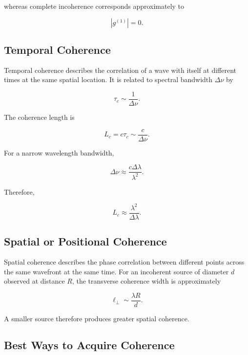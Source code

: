 \documentclass[12pt]{article}
\begin{document}
whereas complete incoherence corresponds approximately to

\begin{equation}
|g^{(1)}|=0.
\end{equation}

\subsection{Temporal Coherence}

Temporal coherence describes the correlation of a wave with itself at different times at the same spatial location. It is related to spectral bandwidth $\Delta\nu$ by

\begin{equation}
\boxed{\tau_c\sim\frac{1}{\Delta\nu}}.
\end{equation}

The coherence length is

\begin{equation}
\boxed{L_c=c\tau_c\sim\frac{c}{\Delta\nu}}.
\end{equation}

For a narrow wavelength bandwidth,

\begin{equation}
\Delta\nu\approx\frac{c\Delta\lambda}{\lambda^2}.
\end{equation}

Therefore,

\begin{equation}
\boxed{L_c\approx\frac{\lambda^2}{\Delta\lambda}}.
\end{equation}

\subsection{Spatial or Positional Coherence}

Spatial coherence describes the phase correlation between different points across the same wavefront at the same time. For an incoherent source of diameter $d$ observed at distance $R$, the transverse coherence width is approximately

\begin{equation}
\ell_{\perp}\sim\frac{\lambda R}{d}.
\end{equation}

A smaller source therefore produces greater spatial coherence.

\subsection{Best Ways to Acquire Coherence}
\end{document}
